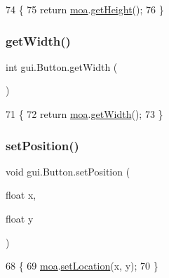 \begin{DoxyCode}
74                           \{
75         \textcolor{keywordflow}{return} \mbox{\hyperlink{classgui_1_1_button_abccfc83b8fee5280bf5022b3b211054e}{moa}}.\mbox{\hyperlink{classorg_1_1newdawn_1_1slick_1_1gui_1_1_mouse_over_area_a216ac5bebcca2e6437b0bbd832934d99}{getHeight}}();
76     \}
\end{DoxyCode}
\mbox{\label{classgui_1_1_button_acfe5d0facf304d658a27e35022e83ddb}} 
\subsubsection{\texorpdfstring{get\+Width()}{getWidth()}}
{\footnotesize\ttfamily int gui.\+Button.\+get\+Width (\begin{DoxyParamCaption}{ }\end{DoxyParamCaption})\hspace{0.3cm}{\ttfamily [inline]}}


\begin{DoxyCode}
71                          \{
72         \textcolor{keywordflow}{return} \mbox{\hyperlink{classgui_1_1_button_abccfc83b8fee5280bf5022b3b211054e}{moa}}.\mbox{\hyperlink{classorg_1_1newdawn_1_1slick_1_1gui_1_1_mouse_over_area_aaf39ffca45d9f2907f597f9e283f8eec}{getWidth}}();
73     \}
\end{DoxyCode}
\mbox{\label{classgui_1_1_button_a53a5e304756fbb7bfe9030f9f260507d}} 
\subsubsection{\texorpdfstring{set\+Position()}{setPosition()}}
{\footnotesize\ttfamily void gui.\+Button.\+set\+Position (\begin{DoxyParamCaption}\item[{float}]{x,  }\item[{float}]{y }\end{DoxyParamCaption})\hspace{0.3cm}{\ttfamily [inline]}}


\begin{DoxyCode}
68                                              \{
69         \mbox{\hyperlink{classgui_1_1_button_abccfc83b8fee5280bf5022b3b211054e}{moa}}.\mbox{\hyperlink{classorg_1_1newdawn_1_1slick_1_1gui_1_1_mouse_over_area_ac55408bd04c3aa272077524dd5cc8e25}{setLocation}}(x, y);
70     \}
\end{DoxyCode}


